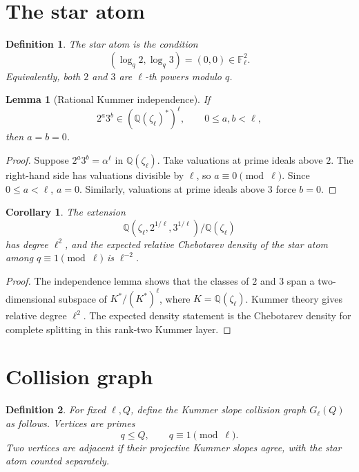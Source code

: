 \documentclass[11pt]{article}
\newtheorem{lemma}{Lemma}
\newtheorem{corollary}{Corollary}
\newtheorem{definition}{Definition}
\newcommand{\Q}{\mathbb Q}
\newcommand{\F}{\mathbb F}
\newcommand{\1}{\mathbf 1}
\begin{document}
\section{The star atom}

\begin{definition}
The star atom is the condition
\[
(\log_q2,\log_q3)=(0,0)\in\F_\ell^2.
\]
Equivalently, both \(2\) and \(3\) are \(\ell\)-th powers modulo \(q\).
\end{definition}

\begin{lemma}[Rational Kummer independence]\label{L:indep}
If
\[
2^a3^b\in(\Q(\zeta_\ell)^*)^\ell,\qquad 0\le a,b<\ell,
\]
then \(a=b=0\).
\end{lemma}

\begin{proof}
Suppose \(2^a3^b=\alpha^\ell\) in \(\Q(\zeta_\ell)\).  Take valuations at prime ideals above \(2\).  The right-hand side has valuations divisible by \(\ell\), so \(a\equiv0\pmod\ell\).  Since \(0\le a<\ell\), \(a=0\).  Similarly, valuations at prime ideals above \(3\) force \(b=0\).
\end{proof}

\begin{corollary}
The extension
\[
\Q(\zeta_\ell,2^{1/\ell},3^{1/\ell})/\Q(\zeta_\ell)
\]
has degree \(\ell^2\), and the expected relative Chebotarev density of the star atom among \(q\equiv1\pmod\ell\) is \(\ell^{-2}\).
\end{corollary}

\begin{proof}
The independence lemma shows that the classes of \(2\) and \(3\) span a two-dimensional subspace of \(K^*/(K^*)^\ell\), where \(K=\Q(\zeta_\ell)\).  Kummer theory gives relative degree \(\ell^2\).  The expected density statement is the Chebotarev density for complete splitting in this rank-two Kummer layer.
\end{proof}

\section{Collision graph}

\begin{definition}
For fixed \(\ell,Q\), define the Kummer slope collision graph \(G_\ell(Q)\) as follows.  Vertices are primes
\[
q\le Q,\qquad q\equiv1\pmod\ell.
\]
Two vertices are adjacent if their projective Kummer slopes agree, with the star atom counted separately.
\end{definition}
\end{document}
